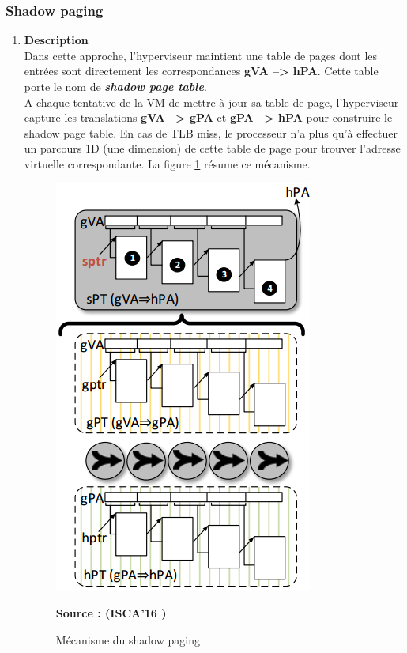\subsubsection{Shadow paging}
\label{subsubsection:shadow_paging}
\begin{enumerate}[label=\textbf{(\roman*)}]
    \item \textbf{Description}\\
    Dans cette approche, l'hyperviseur maintient une table de pages dont les entrées sont directement les correspondances \textbf{\acs{gVA} --> \acs{hPA}}. Cette table porte le nom de \textbf{\textit{shadow page table}}.\\
    A chaque tentative de la VM de mettre à jour sa table de page, l'hyperviseur capture les translations \textbf{\acs{gVA} --> \acs{gPA}} et \textbf{\acs{gPA} --> \acs{hPA}} pour construire le shadow page table. En cas de TLB miss, le processeur n'a plus qu'à effectuer un parcours 1D (une dimension) de cette table de page pour trouver l'adresse virtuelle correspondante. La figure \ref{fig:shadow} résume ce mécanisme.
    \begin{figure}[H]
        \centering
        \includegraphics[scale=.6]{chapters/1/fig1/shadow}
        \caption{Mécanisme du shadow paging}
        \label{fig:shadow}
        \centering \bfseries Source : (ISCA'16 \cite{article6})
    \end{figure}
    

\end{enumerate}
